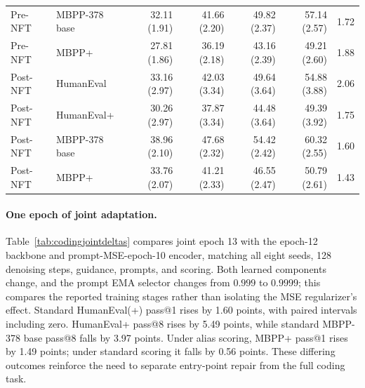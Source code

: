 \documentclass{article}
\begin{document}
\begin{table}[htbp]
\begin{tabular}{@{}llrrrrr@{}}
Pre-NFT & MBPP-378 base & 32.11 {\scriptsize (1.91)} & 41.66 {\scriptsize (2.20)} & 49.82 {\scriptsize (2.37)} & 57.14 {\scriptsize (2.57)} & 1.72\\
Pre-NFT & MBPP+ & 27.81 {\scriptsize (1.86)} & 36.19 {\scriptsize (2.18)} & 43.16 {\scriptsize (2.39)} & 49.21 {\scriptsize (2.60)} & 1.88\\
\midrule
Post-NFT & HumanEval & 33.16 {\scriptsize (2.97)} & 42.03 {\scriptsize (3.34)} & 49.64 {\scriptsize (3.64)} & 54.88 {\scriptsize (3.88)} & 2.06\\
Post-NFT & HumanEval+ & 30.26 {\scriptsize (2.97)} & 37.87 {\scriptsize (3.34)} & 44.48 {\scriptsize (3.64)} & 49.39 {\scriptsize (3.92)} & 1.75\\
Post-NFT & MBPP-378 base & 38.96 {\scriptsize (2.10)} & 47.68 {\scriptsize (2.32)} & 54.42 {\scriptsize (2.42)} & 60.32 {\scriptsize (2.55)} & 1.60\\
Post-NFT & MBPP+ & 33.76 {\scriptsize (2.07)} & 41.21 {\scriptsize (2.33)} & 46.55 {\scriptsize (2.47)} & 50.79 {\scriptsize (2.61)} & 1.43\\
\bottomrule
\end{tabular}
\end{table}



\paragraph{One epoch of joint adaptation.}
Table~\ref{tab:codingjointdeltas} compares joint epoch 13 with the epoch-12 backbone and prompt-MSE-epoch-10 encoder, matching all eight seeds, 128 denoising steps, guidance, prompts, and scoring. Both learned components change, and the prompt EMA selector changes from $0.999$ to $0.9999$; this compares the reported training stages rather than isolating the MSE regularizer's effect. Standard HumanEval(+) pass@1 rises by 1.60 points, with paired intervals including zero. HumanEval+ pass@8 rises by 5.49 points, while standard MBPP-378 base pass@8 falls by 3.97 points. Under alias scoring, MBPP+ pass@1 rises by 1.49 points; under standard scoring it falls by 0.56 points. These differing outcomes reinforce the need to separate entry-point repair from the full coding task.
\end{document}
